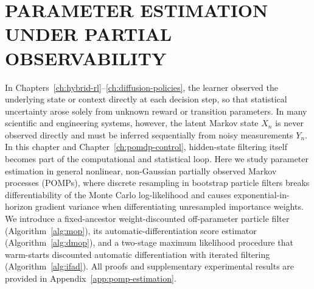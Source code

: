 \chapter{PARAMETER ESTIMATION UNDER PARTIAL OBSERVABILITY}
\label{ch:pomp-estimation}



\begin{aigenblock}
In Chapters~\ref{ch:hybrid-rl}--\ref{ch:diffusion-policies}, the learner observed the underlying state or context directly at each decision step, so that statistical uncertainty arose solely from unknown reward or transition parameters. In many scientific and engineering systems, however, the latent Markov state $X_n$ is never observed directly and must be inferred sequentially from noisy measurements $Y_n$. In this chapter and Chapter~\ref{ch:pomdp-control}, hidden-state filtering itself becomes part of the computational and statistical loop. Here we study parameter estimation in general nonlinear, non-Gaussian partially observed Markov processes (POMPs), where discrete resampling in bootstrap particle filters breaks differentiability of the Monte Carlo log-likelihood and causes exponential-in-horizon gradient variance when differentiating unresampled importance weights. We introduce a fixed-ancestor weight-discounted off-parameter particle filter (Algorithm~\ref{alg:mop}), its automatic-differentiation score estimator (Algorithm~\ref{alg:dmop}), and a two-stage maximum likelihood procedure that warm-starts discounted automatic differentiation with iterated filtering (Algorithm~\ref{alg:ifad}). All proofs and supplementary experimental results are provided in Appendix~\ref{app:pomp-estimation}.
\end{aigenblock}

